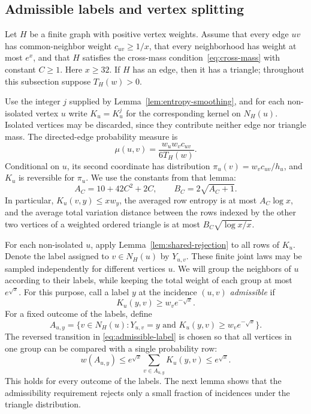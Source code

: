 \subsection{Admissible labels and vertex splitting}

Let $H$ be a finite graph with positive vertex weights. Assume that every
edge $uv$ has common-neighbor weight $c_{uv}\ge1/x$, that every
neighborhood has weight at most $e^x$, and that $H$ satisfies the
cross-mass condition~\eqref{eq:cross-mass} with constant $C\ge1$. Here $x\ge32$. If $H$ has
an edge, then it has a triangle; throughout this subsection suppose
$T_H(w)>0$.

Use the integer $j$ supplied by Lemma~\ref{lem:entropy-smoothing}, and
for each non-isolated vertex $u$ write $K_u=K_u^j$ for the corresponding
kernel on $N_H(u)$. Isolated vertices may be discarded, since they
contribute neither edge nor triangle mass. The
directed-edge probability measure is
\[
 \mu(u,v)=\frac{w_uw_vc_{uv}}{6T_H(w)}.
\]
Conditional on $u$, its second coordinate has distribution
$\pi_u(v)=w_vc_{uv}/h_u$, and $K_u$ is reversible for $\pi_u$.
We use the constants from that lemma:
\[
 A_C=10+42C^2+2C,
 \qquad B_C=2\sqrt{A_C+1}.
\]
In particular, $K_u(v,y)\le xw_y$, the averaged row entropy is at
most $A_C\log x$, and the average total variation distance between
the rows indexed by the other two vertices of a weighted ordered
triangle is at most $B_C\sqrt{\log x/x}$.

For each non-isolated $u$, apply Lemma~\ref{lem:shared-rejection} to all rows of
$K_u$. Denote the label assigned to $v\in N_H(u)$ by $Y_{u,v}$.
These finite joint laws may be sampled independently for different
vertices $u$.  We will group the neighbors of $u$ according to their
labels, while keeping the total weight of each group at most $e^{\sqrt x}$.
For this purpose, call a label $y$ at the incidence $(u,v)$
\emph{admissible} if
\begin{equation}\label{eq:admissible-label}
 K_u(y,v)\ge w_v e^{-\sqrt x}.
\end{equation}
For a fixed outcome of the labels, define
\[
 A_{u,y}=\{v\in N_H(u):Y_{u,v}=y
       \text{ and }K_u(y,v)\ge w_ve^{-\sqrt x}\}.
\]
The reversed transition in \eqref{eq:admissible-label} is chosen so that
all vertices in one group can be compared with a single probability row:
\begin{equation}\label{eq:label-group-weight}
 w(A_{u,y})
 \le e^{\sqrt x}\sum_{v\in A_{u,y}}K_u(y,v)
 \le e^{\sqrt x}.
\end{equation}
This holds for every outcome of the labels.  The next lemma shows that
the admissibility requirement rejects only a small fraction of incidences
under the triangle distribution.

